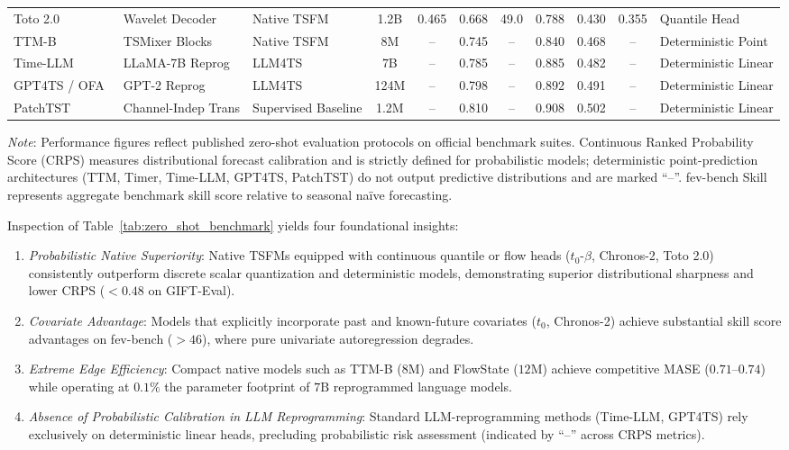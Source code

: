 \begin{table}[t]
{\begin{tabular}{lllc|cc|c|ccc|l}
Toto 2.0~\cite{datadog2026toto2} & Wavelet Decoder & Native TSFM & 1.2B & 0.465 & 0.668 & 49.0 & 0.788 & 0.430 & 0.355 & Quantile Head \\
TTM-B~\cite{ekambaram2024ttm} & TSMixer Blocks & Native TSFM & 8M & -- & 0.745 & -- & 0.840 & 0.468 & -- & Deterministic Point \\
\midrule
Time-LLM~\cite{jin2023timellm} & LLaMA-7B Reprog & LLM4TS & 7B & -- & 0.785 & -- & 0.885 & 0.482 & -- & Deterministic Linear \\
GPT4TS / OFA~\cite{zhou2023onefitsall} & GPT-2 Reprog & LLM4TS & 124M & -- & 0.798 & -- & 0.892 & 0.491 & -- & Deterministic Linear \\
PatchTST~\cite{nie2023patchtst} & Channel-Indep Trans & Supervised Baseline & 1.2M & -- & 0.810 & -- & 0.908 & 0.502 & -- & Deterministic Linear \\
\bottomrule
\end{tabular}
}
\begin{flushleft}
\footnotesize
\emph{Note}: Performance figures reflect published zero-shot evaluation protocols on official benchmark suites. Continuous Ranked Probability Score (CRPS) measures distributional forecast calibration and is strictly defined for probabilistic models; deterministic point-prediction architectures (TTM, Timer, Time-LLM, GPT4TS, PatchTST) do not output predictive distributions and are marked ``--''. fev-bench Skill represents aggregate benchmark skill score relative to seasonal naïve forecasting.
\end{flushleft}
\end{table}

Inspection of Table~\ref{tab:zero_shot_benchmark} yields four foundational insights:
\begin{enumerate}[leftmargin=*]
    \item \emph{Probabilistic Native Superiority}: Native TSFMs equipped with continuous quantile or flow heads ($t_0$-$\beta$, Chronos-2, Toto 2.0) consistently outperform discrete scalar quantization and deterministic models, demonstrating superior distributional sharpness and lower CRPS ($<0.48$ on GIFT-Eval).
    \item \emph{Covariate Advantage}: Models that explicitly incorporate past and known-future covariates ($t_0$, Chronos-2) achieve substantial skill score advantages on fev-bench ($>46$), where pure univariate autoregression degrades.
    \item \emph{Extreme Edge Efficiency}: Compact native models such as TTM-B ($8\text{M}$) and FlowState ($12\text{M}$) achieve competitive MASE ($0.71$--$0.74$) while operating at $0.1\%$ the parameter footprint of $7\text{B}$ reprogrammed language models.
    \item \emph{Absence of Probabilistic Calibration in LLM Reprogramming}: Standard LLM-reprogramming methods (Time-LLM, GPT4TS) rely exclusively on deterministic linear heads, precluding probabilistic risk assessment (indicated by ``--'' across CRPS metrics).
\end{enumerate}

